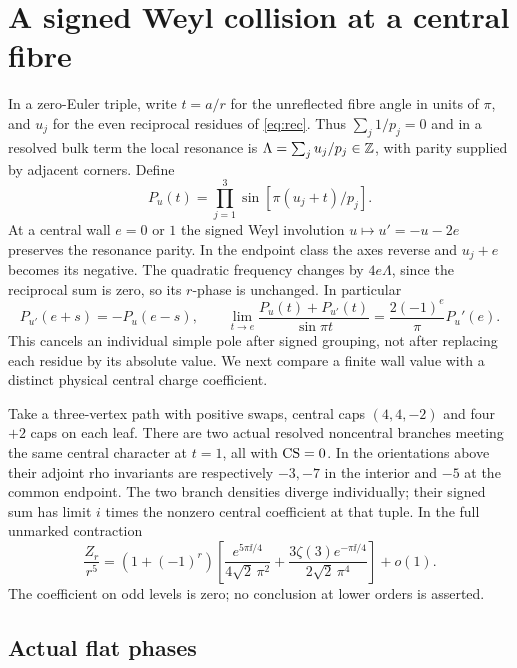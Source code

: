 \section{A signed Weyl collision at a central fibre}\label{sec:wall}

In a zero-Euler triple, write \(t=a/r\) for the unreflected fibre angle in units of \(\pi\), and \(u_j\) for the even reciprocal residues of \eqref{eq:rec}. Thus \(\sum_j1/p_j=0\) and in a resolved bulk term the local resonance is \(\Lambda=\sum_j u_j/p_j\in\mathbb Z\), with parity supplied by adjacent corners. Define
\[
 P_u(t)=\prod_{j=1}^3\sin[\pi(u_j+t)/p_j].
\]
At a central wall \(e=0\) or \(1\) the signed Weyl involution \(u\mapsto u'=-u-2e\) preserves the resonance parity. In the endpoint class the axes reverse and \(u_j+e\) becomes its negative. The quadratic frequency changes by \(4e\Lambda\), since the reciprocal sum is zero, so its \(r\)-phase is unchanged. In particular
\begin{equation}\label{eq:weyl-pair}
 P_{u'}(e+s)=-P_u(e-s),\qquad
 \lim_{t\to e}\frac{P_u(t)+P_{u'}(t)}{\sin\pi t}
  =\frac{2(-1)^e}{\pi}P_u'(e).
\end{equation}
This cancels an individual simple pole after signed grouping, not after replacing each residue by its absolute value. We next compare a finite wall value with a distinct physical central charge coefficient.

\begin{theorem}\label{thm:star}
Take a three-vertex path with positive swaps, central caps \((4,4,-2)\) and four \(+2\) caps on each leaf. There are two actual resolved noncentral branches meeting the same central character at \(t=1\), all with \(\operatorname{CS}=0\). In the orientations above their adjoint rho invariants are respectively \(-3,-7\) in the interior and \(-5\) at the common endpoint. The two branch densities diverge individually; their signed sum has limit \(i\) times the nonzero central coefficient at that tuple. In the full unmarked contraction
\begin{equation}\label{eq:star}
 \frac{Z_r}{r^5}=(1+(-1)^r)\left[
       \frac{e^{5\pi\ii/4}}{4\sqrt2\,\pi^2}
      +\frac{3\zeta(3)e^{-\pi\ii/4}}{2\sqrt2\,\pi^4}\right]+o(1).
\end{equation}
The coefficient on odd levels is zero; no conclusion at lower orders is asserted.
\end{theorem}

\subsection{Actual flat phases}

